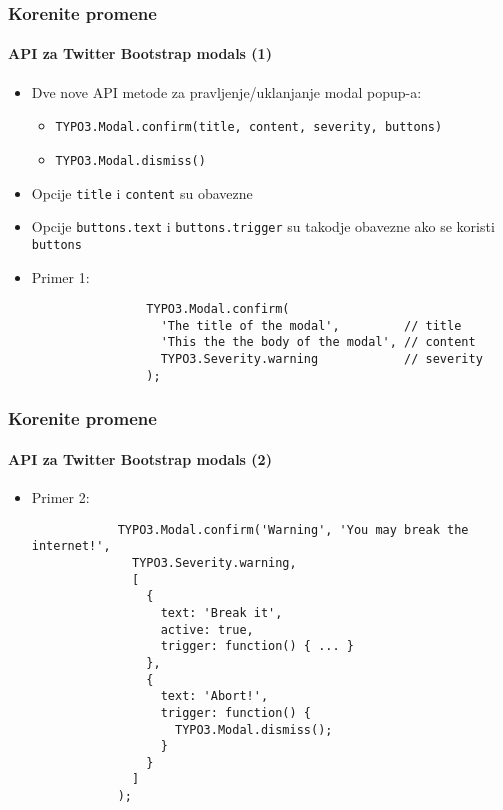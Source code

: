 \begin{frame}[fragile]
	\frametitle{Korenite promene}
	\framesubtitle{API za Twitter Bootstrap modals (1)}

	\lstset{basicstyle=\smaller\ttfamily}

	\begin{itemize}

		\item Dve nove API metode za pravljenje/uklanjanje modal popup-a:
			\begin{itemize}
				\item \texttt{TYPO3.Modal.confirm(title, content, severity, buttons)}
				\item \texttt{TYPO3.Modal.dismiss()}
			\end{itemize}

		\item Opcije \texttt{title} i \texttt{content} su obavezne
		\item Opcije \texttt{buttons.text} i \texttt{buttons.trigger} su takodje obavezne ako se koristi \texttt{buttons}

		\item Primer 1:

			\begin{lstlisting}
				TYPO3.Modal.confirm(
				  'The title of the modal',         // title
				  'This the the body of the modal', // content
				  TYPO3.Severity.warning            // severity
				);
			\end{lstlisting}

	\end{itemize}

\end{frame}


\begin{frame}[fragile]
	\frametitle{Korenite promene}
	\framesubtitle{API za Twitter Bootstrap modals (2)}

	\begin{itemize}

		\item Primer 2:

		\begin{lstlisting}
			TYPO3.Modal.confirm('Warning', 'You may break the internet!',
			  TYPO3.Severity.warning,
			  [
			    {
			      text: 'Break it',
			      active: true,
			      trigger: function() { ... }
			    },
			    {
			      text: 'Abort!',
			      trigger: function() {
			        TYPO3.Modal.dismiss();
			      }
			    }
			  ]
			);
		\end{lstlisting}

	\end{itemize}

\end{frame}

